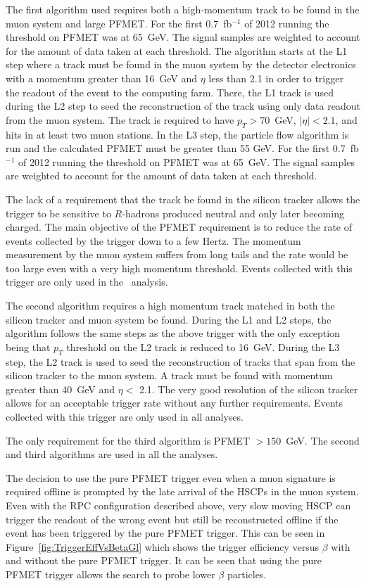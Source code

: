 The first algorithm used requires both a high-momentum track to be found in the muon system and large PFMET.
For the first 0.7~fb$^{-1}$ of 2012 running the threshold on PFMET was at 65~GeV. The signal samples are weighted
to account for the amount of data taken at each threshold.
The algorithm starts at the L1 step where a track must be found in the muon system by the detector electronics with a momentum greater than 16~GeV and $\eta$ less than 2.1 
in order to trigger the readout of the event to the computing farm.
There, the L1 track is used during the L2 step to seed the reconstruction of the track using only data readout from the muon system.
The track is required to have $p_T > 70$~GeV, $|\eta| < 2.1$, and hits in at least two muon stations.
In the L3 step, the particle flow algorithm is run and the calculated PFMET must be greater than 55 GeV.
For the first 0.7~fb$^{-1}$ of 2012 running the threshold on PFMET was at 65~GeV. The signal samples are weighted
to account for the amount of data taken at each threshold.

The lack of a requirement that the track be found in the silicon tracker allows the trigger to be sensitive to $R$-hadrons produced neutral and only later becoming charged.
The main objective of the PFMET requirement is to reduce the rate of events collected by the trigger
down to a few Hertz. The momentum measurement by the muon system suffers from long tails and the rate would be too large even with a very high momentum threshold.
Events collected with this trigger are only used in the \muononly\ analysis.

The second algorithm requires a high momentum track matched in both the silicon tracker and muon system be found.
During the L1 and L2 steps, the algorithm follows the same steps as the above trigger with the only exception being that $p_T$ threshold on the L2 track
is reduced to 16~GeV. During the L3 step, the L2 track is used to seed the reconstruction of tracks that span from the silicon tracker to the muon system.
A track must be found with momentum greater than 40~GeV and $\eta <$ 2.1. The very good resolution of the silicon tracker allows for an acceptable trigger rate
without any further requirements. Events collected with this trigger are only used in all analyses.

The only requirement for the third algorithm is PFMET $ > 150$~GeV.
The second and third algorithms are used in all the analyses.

The decision to use the pure PFMET trigger even when a muon signature is required offline is prompted by the late arrival of the HSCPs in the muon system.
Even with the RPC configuration described above, very slow moving HSCP can trigger the readout of the wrong event but still be reconstructed offline
if the event has been triggered by the pure PFMET trigger. This can be seen in Figure~\ref{fig:TriggerEffVsBetaGl} which shows the trigger efficiency versus $\beta$
with and without the pure PFMET trigger.
It can be seen that using the pure PFMET trigger allows the search to probe lower $\beta$ particles. 

